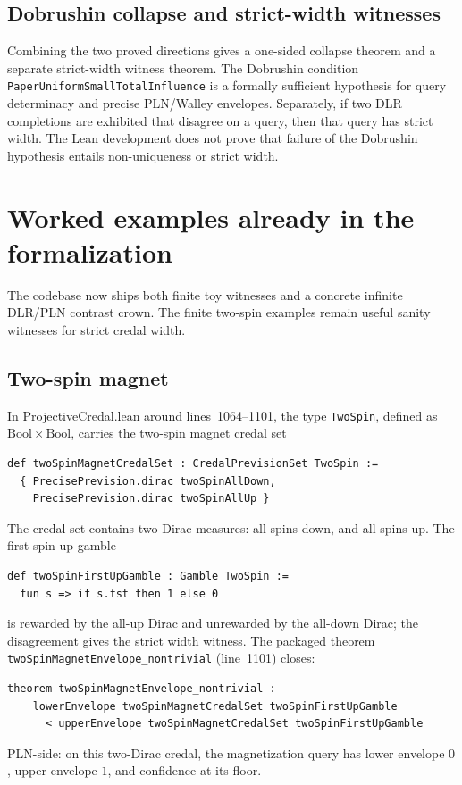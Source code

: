 \documentclass[]{article}
\newcommand{\lid}[1]{{\ttfamily\nolinkurl{#1}}}
\begin{document}
\subsection{Dobrushin collapse and strict-width witnesses}

Combining the two proved directions gives a one-sided collapse theorem
and a separate strict-width witness theorem. The Dobrushin condition
\lid{PaperUniformSmallTotalInfluence} is a formally sufficient hypothesis
for query determinacy and precise PLN/Walley envelopes. Separately, if
two DLR completions are exhibited that disagree on a query, then that
query has strict width. The Lean development does not prove that failure
of the Dobrushin hypothesis entails non-uniqueness or strict width.

\section{Worked examples already in the formalization}\label{sec:examples}

The codebase now ships both finite toy witnesses and a concrete infinite
DLR/PLN contrast crown. The finite two-spin examples remain useful sanity
witnesses for strict credal width.

\subsection{Two-spin magnet}

In ProjectiveCredal.lean around lines~1064--1101, the type
\lid{TwoSpin}, defined as $\mathrm{Bool} \times \mathrm{Bool}$, carries the two-spin
magnet credal set
\begin{lstlisting}
def twoSpinMagnetCredalSet : CredalPrevisionSet TwoSpin :=
  { PrecisePrevision.dirac twoSpinAllDown,
    PrecisePrevision.dirac twoSpinAllUp }
\end{lstlisting}
The credal set contains two Dirac measures: all spins down, and all
spins up. The first-spin-up gamble
\begin{lstlisting}
def twoSpinFirstUpGamble : Gamble TwoSpin :=
  fun s => if s.fst then 1 else 0
\end{lstlisting}
is rewarded by the all-up Dirac and unrewarded by the all-down Dirac;
the disagreement gives the strict width witness. The packaged theorem
\lid{twoSpinMagnetEnvelope\_nontrivial} (line~1101) closes:
\begin{lstlisting}
theorem twoSpinMagnetEnvelope_nontrivial :
    lowerEnvelope twoSpinMagnetCredalSet twoSpinFirstUpGamble
      < upperEnvelope twoSpinMagnetCredalSet twoSpinFirstUpGamble
\end{lstlisting}
PLN-side: on this two-Dirac credal, the magnetization query has lower
envelope $0$, upper envelope $1$, and confidence at its floor.
\end{document}
